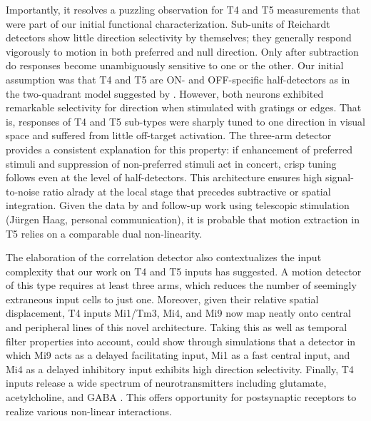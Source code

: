 Importantly, it resolves a puzzling observation for T4 and T5 measurements that were part of our initial functional characterization. Sub-units of Reichardt detectors show little direction selectivity by themselves; they generally respond vigorously to motion in both preferred and null direction. Only after subtraction do responses become unambiguously sensitive to one or the other. Our initial assumption was that T4 and T5 are ON- and OFF-specific half-detectors as in the two-quadrant model suggested by \citet{Eichner:2011ic}. However, both neurons exhibited remarkable selectivity for direction when stimulated with gratings or edges. That is, responses of T4 and T5 sub-types were sharply tuned to one direction in visual space and suffered from little off-target activation. The three-arm detector provides a consistent explanation for this property: if enhancement of preferred stimuli and suppression of non-preferred stimuli act in concert, crisp tuning follows even at the level of half-detectors. This architecture ensures high signal-to-noise ratio alrady at the local stage that precedes subtractive or spatial integration. Given the data by \citet{Leong:2016hu} and follow-up work using telescopic stimulation (Jürgen Haag, personal communication), it is probable that motion extraction in T5 relies on a comparable dual non-linearity.

The elaboration of the correlation detector also contextualizes the input complexity that our work on T4 and T5 inputs has suggested. A motion detector of this type requires at least three arms, which reduces the number of seemingly extraneous input cells to just one. Moreover, given their relative spatial displacement, T4 inputs Mi1/Tm3, Mi4, and Mi9 now map neatly onto central and peripheral lines of this novel architecture. Taking this as well as temporal filter properties into account, \citet{Arenz:2017aa} could show through simulations that a detector in which Mi9 acts as a delayed facilitating input, Mi1 as a fast central input, and Mi4 as a delayed inhibitory input exhibits high direction selectivity. Finally, T4 inputs release a wide spectrum of neurotransmitters including glutamate, acetylcholine, and GABA \citep{Pankova:2017aa,Takemura:2017aa}. This offers opportunity for postsynaptic receptors to realize various non-linear interactions.

